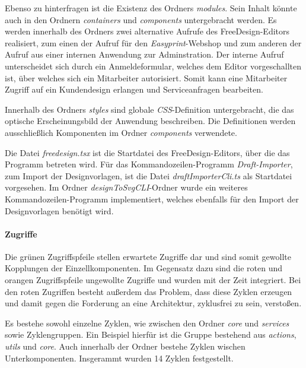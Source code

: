 Ebenso zu hinterfragen ist die Existenz des Ordners \emph{modules}. Sein Inhalt könnte auch in den Ordnern \emph{containers} und  \emph{components} untergebracht werden. Es werden innerhalb des Ordners zwei alternative Aufrufe des FreeDesign-Editors realisiert, zum einen der Aufruf für den \emph{Easyprint}-Webshop und zum anderen der Aufruf aus einer internen Anwendung zur Adminstration. Der interne Aufruf unterscheidet sich durch ein Anmeldeformular, welches dem Editor vorgeschallten ist, über welches sich ein Mitarbeiter autorisiert. Somit kann eine Mitarbeiter Zugriff auf ein Kundendesign erlangen und Serviceanfragen bearbeiten. 

Innerhalb des Ordners \emph{styles} sind globale \emph{CSS}-Definition untergebracht, die das optische Erscheinungsbild der Anwendung beschreiben. Die Definitionen werden ausschließlich Komponenten im Ordner \emph{components} verwendete. 


Die Datei \emph{freedesign.tsx} ist die Startdatei des FreeDesign-Editors, über die das Programm betreten wird. Für das Kommandozeilen-Programm \emph{Draft-Importer}, zum Import der Designvorlagen, ist die Datei \emph{draftImporterCli.ts} als Startdatei vorgesehen. Im Ordner \emph{designToSvgCLI}-Ordner wurde ein weiteres Kommandozeilen-Programm implementiert, welches ebenfalls für den Import der Designvorlagen benötigt wird.


\paragraph{Zugriffe}
Die grünen Zugriffspfeile stellen erwartete Zugriffe dar und sind somit gewollte Kopplungen der Einzellkomponenten. Im Gegensatz dazu sind die roten und orangen Zugriffspfeile ungewollte Zugriffe und wurden mit der Zeit integriert. Bei den roten Zugriffen besteht außerdem das Problem, dass diese Zyklen erzeugen und damit gegen die Forderung an eine Architektur, zyklusfrei zu sein, verstoßen. 

Es bestehe sowohl einzelne Zyklen, wie zwischen den Ordner \emph{core} und \emph{services} sowie Zyklengruppen. Ein Beispiel hierfür ist die Gruppe bestehend aus \emph{actions}, \emph{utils} und \emph{core}.
Auch innerhalb der Ordner bestehe Zyklen wischen Unterkomponenten. 
Insgerammt wurden 14 Zyklen festgestellt.



